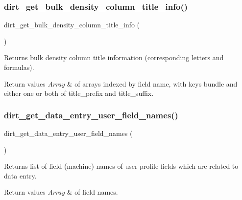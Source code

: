 \subsubsection{\texorpdfstring{dirt\+\_\+get\+\_\+bulk\+\_\+density\+\_\+column\+\_\+title\+\_\+info()}{dirt\_get\_bulk\_density\_column\_title\_info()}}
{\footnotesize\ttfamily dirt\+\_\+get\+\_\+bulk\+\_\+density\+\_\+column\+\_\+title\+\_\+info (\begin{DoxyParamCaption}{ }\end{DoxyParamCaption})}

Returns bulk density column title information (corresponding letters and formulas).


\begin{DoxyRetVals}{Return values}
{\em Array} & of arrays indexed by field name, with keys \textquotesingle{}bundle\textquotesingle{} and either one or both of \textquotesingle{}title\+\_\+prefix\textquotesingle{} and \textquotesingle{}title\+\_\+suffix\textquotesingle{}. \\
\hline
\end{DoxyRetVals}
\mbox{\label{dirt_8fields_8inc_a2b6ec10e6817d4be9ac6788a657e05c1}} 
\subsubsection{\texorpdfstring{dirt\+\_\+get\+\_\+data\+\_\+entry\+\_\+user\+\_\+field\+\_\+names()}{dirt\_get\_data\_entry\_user\_field\_names()}}
{\footnotesize\ttfamily dirt\+\_\+get\+\_\+data\+\_\+entry\+\_\+user\+\_\+field\+\_\+names (\begin{DoxyParamCaption}{ }\end{DoxyParamCaption})}

Returns list of field (machine) names of user profile fields which are related to data entry.


\begin{DoxyRetVals}{Return values}
{\em Array} & of field names. \\
\hline
\end{DoxyRetVals}
\mbox{\label{dirt_8fields_8inc_a681957a0f276662e3fce712e5e14c11f}} 
